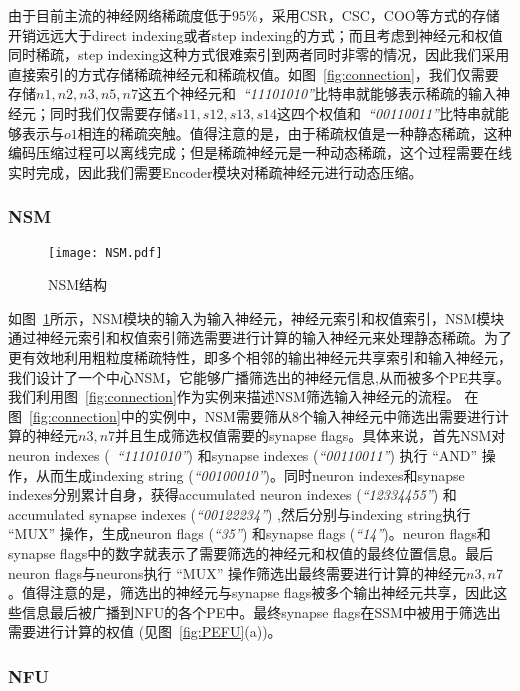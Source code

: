 由于目前主流的神经网络稀疏度低于$95\%$，采用CSR，CSC，COO等方式的存储开销远远大于direct indexing或者step indexing的方式；而且考虑到神经元和权值同时稀疏，step indexing这种方式很难索引到两者同时非零的情况，因此我们采用直接索引的方式存储稀疏神经元和稀疏权值。如图~\ref{fig:connection}，我们仅需要存储$n1, n2, n3, n5, n7$这五个神经元和~\emph{“11101010”}比特串就能够表示稀疏的输入神经元；同时我们仅需要存储$s11, s12, s13, s14$这四个权值和~\emph{“00110011”}比特串就能够表示与$o1$相连的稀疏突触。值得注意的是，由于稀疏权值是一种静态稀疏，这种编码压缩过程可以离线完成；但是稀疏神经元是一种动态稀疏，这个过程需要在线实时完成，因此我们需要Encoder模块对稀疏神经元进行动态压缩。

\subsubsection{NSM}
\begin{figure}[h]
\centering
\texttt{[image: NSM.pdf]}
\caption{NSM结构}
\label{fig:NSM}
\end{figure}

如图~\ref{fig:NSM}所示，NSM模块的输入为输入神经元，神经元索引和权值索引，NSM模块通过神经元索引和权值索引筛选需要进行计算的输入神经元来处理静态稀疏。为了更有效地利用粗粒度稀疏特性，即多个相邻的输出神经元共享索引和输入神经元，我们设计了一个中心NSM，它能够广播筛选出的神经元信息,从而被多个PE共享。我们利用图~\ref{fig:connection}作为实例来描述NSM筛选输入神经元的流程。
在图~\ref{fig:connection}中的实例中，NSM需要筛从8个输入神经元中筛选出需要进行计算的神经元$n3, n7$并且生成筛选权值需要的synapse flags。具体来说，首先NSM对neuron indexes (~\emph{“11101010”}) 和synapse indexes (\emph{“00110011”}) 执行 “AND” 操作，从而生成indexing string (\emph{“00100010”})。同时neuron indexes和synapse indexes分别累计自身，获得accumulated neuron indexes (\emph{“12334455”}) 和accumulated synapse indexes (\emph{“00122234”}) ,然后分别与indexing string执行 “MUX” 操作，生成neuron flags (\emph{“35”}) 和synapse flags (\emph{“14”})。neuron flags和synapse flags中的数字就表示了需要筛选的神经元和权值的最终位置信息。最后neuron flags与neurons执行 “MUX” 操作筛选出最终需要进行计算的神经元$n3, n7$。值得注意的是，筛选出的神经元与synapse flags被多个输出神经元共享，因此这些信息最后被广播到NFU的各个PE中。最终synapse flags在SSM中被用于筛选出需要进行计算的权值 (见图~\ref{fig:PEFU}(a))。

\subsubsection{NFU}

